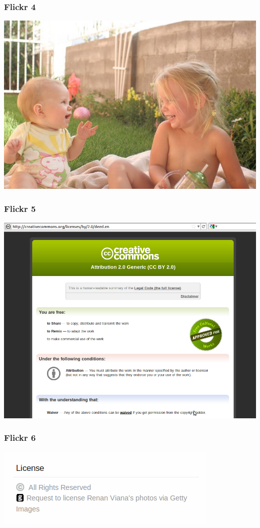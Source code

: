 \documentclass[mathserif,xcolor=dvipsnames,hyperref={bookmarks=true}]{beamer}
\begin{document}
    \begin{frame}[t]
        \frametitle{Flickr 4}
        \begin{center}
            \includegraphics[height=0.9\textheight]{katherine-and-evelyn.jpg}
        \end{center}
    \end{frame}
    \begin{frame}[t]
        \frametitle{Flickr 5}
        \begin{center}
            \includegraphics[height=0.9\textheight]{link-to-cc-license-from-flickr.png}
        \end{center}
    \end{frame}
    \begin{frame}[t]
        \frametitle{Flickr 6}
        \begin{center}
            \includegraphics[height=0.9\textheight]{request-to-license1.png}
        \end{center}
    \end{frame}
\end{document}
